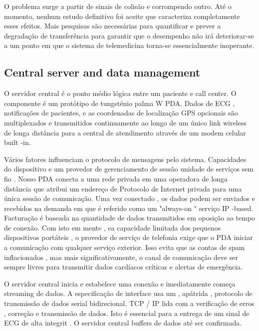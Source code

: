 \documentclass[12pt]{article} %
\begin{document}
O problema surge a partir de sinais de colisão e corrompendo outro. Até o momento, nenhum estudo definitivo foi aceite que caracteriza completamente esses efeitos. Mais pesquisas são necessárias para quantificar e prever a degradação de transferência para garantir que o desempenho não irá deteriorar-se a um ponto em que o sistema de telemedicina torna-se essencialmente inoperante.


\subsection{Central server and data management} %

O servidor central é o ponto médio lógica entre um paciente e call center. O componente é um protótipo de tungsténio palma W PDA. Dados de ECG , notificações de pacientes, e as coordenadas de localização GPS opcionais são multiplexados e transmitidos continuamente ao longo de um único link wireless de longa distância para a central de atendimento através de um modem celular built -in.

Vários fatores influenciam o protocolo de mensagens pelo sistema. Capacidades do dispositivo e um provedor de gerenciamento de sessão unidade de serviços sem fio . Nosso PDA conecta a uma rede privada em uma operadora de longa distância que atribui um endereço de Protocolo de Internet privada para uma única sessão de comunicação. Uma vez conectado , os dados podem ser enviados e recebidos na demanda em que é referido como um "always-on " serviço IP -based. Facturação é baseada na quantidade de dados transmitidos em oposição ao tempo de conexão. Com isto em mente , ea capacidade limitada dos pequenos dispositivos portáteis , o provedor de serviço de telefonia exige que o PDA iniciar a comunicação com qualquer serviço exterior. Isso evita que as contas de spam inflacionados , mas mais significativamente, o canal de comunicação deve ser sempre livres para transmitir dados cardíacos críticas e alertas de emergência.

O servidor central inicia e estabelece uma conexão e imediatamente começa streaming de dados. A especificação de interface usa um , apátrida , protocolo de transmissão de dados serial bidirecional. TCP / IP lida com a verificação de erros , correção e transmissão de dados. Isto é essencial para a entrega de um sinal de ECG de alta integrit . O servidor central buffers de dados até ser confirmada.
\end{document}
